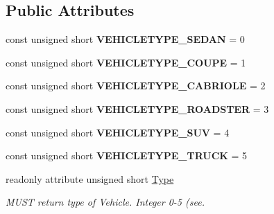\subsection*{Public Attributes}
\begin{DoxyCompactItemize}
\item 
\hypertarget{interfaceVehicle_1_1VehicleType_aad31b9d154f9359ceed020621bc59cd0}{const unsigned short {\bfseries V\-E\-H\-I\-C\-L\-E\-T\-Y\-P\-E\-\_\-\-S\-E\-D\-A\-N} = 0}\label{interfaceVehicle_1_1VehicleType_aad31b9d154f9359ceed020621bc59cd0}

\item 
\hypertarget{interfaceVehicle_1_1VehicleType_a04dea9fd8698f02d9c6f835b082e656d}{const unsigned short {\bfseries V\-E\-H\-I\-C\-L\-E\-T\-Y\-P\-E\-\_\-\-C\-O\-U\-P\-E} = 1}\label{interfaceVehicle_1_1VehicleType_a04dea9fd8698f02d9c6f835b082e656d}

\item 
\hypertarget{interfaceVehicle_1_1VehicleType_ae5627ffcd6be6d675a891c92327c6caf}{const unsigned short {\bfseries V\-E\-H\-I\-C\-L\-E\-T\-Y\-P\-E\-\_\-\-C\-A\-B\-R\-I\-O\-L\-E} = 2}\label{interfaceVehicle_1_1VehicleType_ae5627ffcd6be6d675a891c92327c6caf}

\item 
\hypertarget{interfaceVehicle_1_1VehicleType_aad6e8b1cd79a614c94743390a839aaae}{const unsigned short {\bfseries V\-E\-H\-I\-C\-L\-E\-T\-Y\-P\-E\-\_\-\-R\-O\-A\-D\-S\-T\-E\-R} = 3}\label{interfaceVehicle_1_1VehicleType_aad6e8b1cd79a614c94743390a839aaae}

\item 
\hypertarget{interfaceVehicle_1_1VehicleType_a2ad66fbd688a9be8277c3897d822d347}{const unsigned short {\bfseries V\-E\-H\-I\-C\-L\-E\-T\-Y\-P\-E\-\_\-\-S\-U\-V} = 4}\label{interfaceVehicle_1_1VehicleType_a2ad66fbd688a9be8277c3897d822d347}

\item 
\hypertarget{interfaceVehicle_1_1VehicleType_a76dbb43b9b94db8a48d7c2ee5944efea}{const unsigned short {\bfseries V\-E\-H\-I\-C\-L\-E\-T\-Y\-P\-E\-\_\-\-T\-R\-U\-C\-K} = 5}\label{interfaceVehicle_1_1VehicleType_a76dbb43b9b94db8a48d7c2ee5944efea}

\item 
readonly attribute unsigned short \hyperlink{interfaceVehicle_1_1VehicleType_a8c8213ea9197f85da85cfda90ad2a651}{Type}
\begin{DoxyCompactList}\small\item\em M\-U\-S\-T return type of Vehicle. Integer 0-\/5 (see. \end{DoxyCompactList}\end{DoxyCompactItemize}
